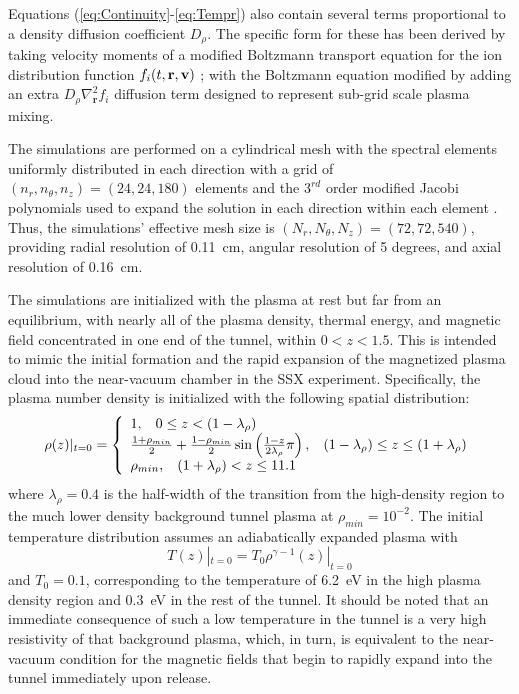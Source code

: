 Equations (\ref{eq:Continuity}-\ref{eq:Tempr}) also contain several terms proportional to a density diffusion coefficient $D_\rho$.  The specific form for these has been derived by taking velocity moments of a modified Boltzmann transport equation for the ion distribution function $f_i(t,\mathbf{r},\mathbf{v})$ \cite{Krall86}; with the Boltzmann equation modified by adding an extra $D_\rho\nabla_{\mathbf{r}}^2 f_i$ diffusion term designed to represent sub-grid scale plasma mixing.

The simulations are performed on a cylindrical mesh with the spectral elements uniformly distributed in each direction with a grid of $(n_r,n_\theta,n_z)=(24,24,180)$ elements and the $3^{rd}$ order modified Jacobi polynomials used to expand the solution in each direction within each element \cite{Lukin08}.  Thus, the simulations' effective mesh size is $(N_r,N_\theta,N_z)=(72,72,540)$, providing radial resolution of 0.11~cm, angular resolution of 5 degrees, and axial resolution of 0.16~cm.

The simulations are initialized with the plasma at rest but far from an equilibrium, with nearly all of the plasma density, thermal energy, and magnetic field concentrated in one end of the tunnel, within $0 < z < 1.5$. This is intended to mimic the initial formation and the rapid expansion of the magnetized plasma cloud into the near-vacuum chamber in the SSX experiment. Specifically, the plasma number density is initialized with the following spatial distribution:
\begin{equation}
\rho(z)|_{t=0} = \left\{\begin{array}{l} 
1, \hspace{3mm} 0 \le z < (1 - \lambda_\rho) \\
\frac{1+\rho_{min}}{2} + \frac{1-\rho_{min}}{2}\sin\left(\frac{1-z}{2\lambda_\rho}\pi\right), \hspace{3mm} (1 - \lambda_\rho) \le z \le (1 + \lambda_\rho) \\
\rho_{min}, \hspace{3mm} (1 + \lambda_\rho) < z \le 11.1
\end{array}\right.
\end{equation}
where $\lambda_\rho=0.4$ is the half-width of the transition from the high-density region to the much lower density background tunnel plasma at $\rho_{min} = 10^{-2}$. The initial temperature distribution assumes an adiabatically expanded plasma with 
\begin{equation}
T(z)|_{t=0} = T_0\rho^{\gamma-1}(z)|_{t=0}
\end{equation}
and $T_0 = 0.1$, corresponding to the temperature of 6.2~eV in the high plasma density region and 0.3~eV in the rest of the tunnel. It should be noted that an immediate consequence of such a low temperature in the tunnel is a very high resistivity of that background plasma, which, in turn, is equivalent to the near-vacuum condition for the magnetic fields that begin to rapidly expand into the tunnel immediately upon release.

